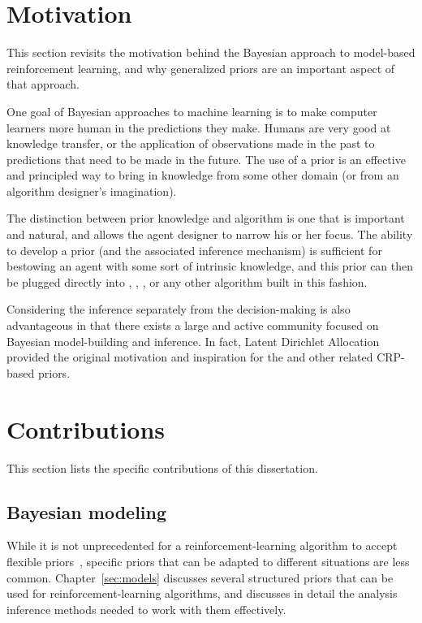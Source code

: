 
\section{Motivation}

This section revisits the motivation behind the Bayesian approach to model-based reinforcement learning, and why generalized priors are an important aspect of that approach.

One goal of Bayesian approaches to machine learning is to make computer learners more human in the predictions they make. Humans are very good at knowledge transfer, or the application of observations made in the past to predictions that need to be made in the future. The use of a prior is an effective and principled way to bring in knowledge from some other domain (or from an algorithm designer's imagination).

The distinction between prior knowledge and algorithm is one that is important and natural, and allows the agent designer to narrow his or her focus. The ability to develop a prior (and the associated inference mechanism) is sufficient for bestowing an agent with some sort of intrinsic knowledge, and this prior can then be plugged directly into , , , or any other algorithm built in this fashion.

Considering the inference separately from the decision-making is also advantageous in that there exists a large and active community focused on Bayesian model-building and inference. In fact, Latent  Dirichlet Allocation~\cite{blei2003latent} provided the original motivation and inspiration for the  and other related CRP-based priors.

\section{Contributions}

This section lists the specific contributions of this dissertation.

\subsection{Bayesian modeling}

While it is not unprecedented for a reinforcement-learning algorithm to accept flexible priors~\cite{strens00,wilson07,doshi2009infinite}, specific priors that can be adapted to different situations are less common. Chapter~\ref{sec:models} discusses several structured priors that can be used for reinforcement-learning algorithms, and discusses in detail the analysis inference methods needed to work with them effectively.

